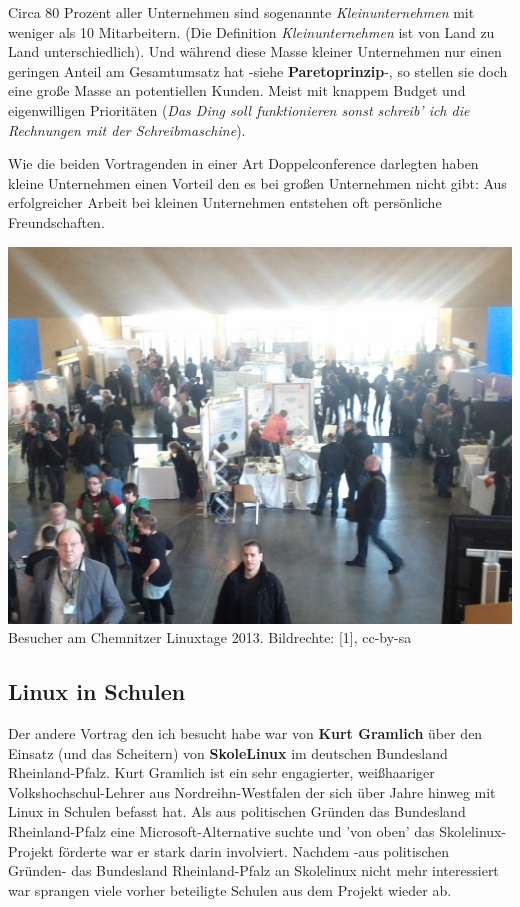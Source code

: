 Circa 80 Prozent aller Unternehmen sind sogenannte \textit{Kleinunternehmen} mit weniger als 10 Mitarbeitern. (Die Definition \textit{Kleinunternehmen} ist von Land zu Land unterschiedlich). Und während diese Masse kleiner Unternehmen nur einen geringen Anteil am Gesamtumsatz hat -siehe \textbf{Paretoprinzip}-, so stellen sie doch eine große Masse an potentiellen Kunden. Meist mit knappem Budget und eigenwilligen Prioritäten (\textit{Das Ding soll funktionieren sonst schreib' ich die Rechnungen mit der Schreibmaschine}). 

Wie die beiden Vortragenden in einer Art Doppelconference darlegten haben kleine Unternehmen einen Vorteil den es bei großen Unternehmen nicht gibt: Aus erfolgreicher Arbeit bei kleinen Unternehmen entstehen oft persönliche Freundschaften.

\begin{center}
\includegraphics[width=\linewidth]{chemnitz/chemnitz_messe.jpg}
\footnotesize{Besucher am Chemnitzer Linuxtage 2013. Bildrechte: [1], cc-by-sa}
\end{center}

\subsection*{Linux in Schulen}

Der andere Vortrag den ich besucht habe war von \textbf{Kurt Gramlich} über den Einsatz (und das Scheitern) von \textbf{SkoleLinux} im deutschen Bundesland Rheinland-Pfalz. Kurt Gramlich ist ein sehr engagierter, weißhaariger Volkshochschul-Lehrer aus Nordreihn-Westfalen der sich über Jahre hinweg mit Linux in Schulen befasst hat. Als aus politischen Gründen das Bundesland Rheinland-Pfalz eine Microsoft-Alternative suchte und 'von oben' das Skolelinux-Projekt förderte war er stark darin involviert. Nachdem -aus politischen Gründen- das Bundesland Rheinland-Pfalz an Skolelinux nicht mehr interessiert war sprangen viele vorher beteiligte Schulen aus dem Projekt wieder ab.

